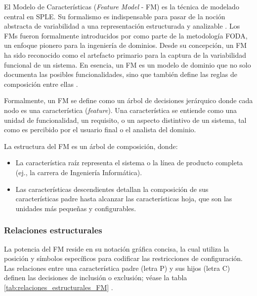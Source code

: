 El Modelo de Características (\textit{Feature Model} - \ac{FM}) es la técnica de modelado
central en \ac{SPLE}. Su formalismo es
indispensable para pasar de la noción abstracta de variabilidad a una
representación estructurada y analizable \citep{ptc_feature_models}. 
Los \ac{FM}s fueron formalmente introducidos por \citet{kang1990foda} 
como parte de la metodología \ac{FODA}, un enfoque pionero para la ingeniería de dominios. 
Desde su concepción, un \ac{FM} ha sido reconocido como el artefacto
primario para la captura de la variabilidad funcional de un sistema. En esencia,
un \ac{FM} es un modelo de dominio que no solo documenta las posibles
funcionalidades, sino que también define las reglas de composición entre ellas
\citep{gfg_feature_engineering}.
            
Formalmente, un \ac{FM} se define como un árbol de
decisiones jerárquico donde cada nodo es una característica (\textit{feature}). Una
característica se entiende como una unidad de funcionalidad, un requisito, o un
aspecto distintivo de un sistema, tal como es percibido por el usuario final o el
analista del dominio.

La estructura del \ac{FM} es un árbol de composición, donde:
\begin{itemize}
    \item La característica raíz representa el sistema o la línea de producto
    completa (ej., la carrera de Ingeniería Informática).
    \item Las características descendientes detallan la composición de sus
    características padre hasta alcanzar las características hoja, que son las
    unidades más pequeñas y configurables.
\end{itemize}

\subsubsection{Relaciones estructurales}

La potencia del \ac{FM} reside en su notación gráfica concisa, la cual utiliza la
posición y símbolos específicos para codificar las restricciones de
configuración. Las relaciones entre una característica padre (letra P) y sus hijos (letra C) definen
las decisiones de inclusión o exclusión; véase la tabla
\ref{tab:relaciones_estructurales_FM} 
\citep{pohl2005software, kang1990foda, benavides2010PrinciplesFM, 
benavides2010automated, Wang2007FormalSemanticsFM}.
                        
